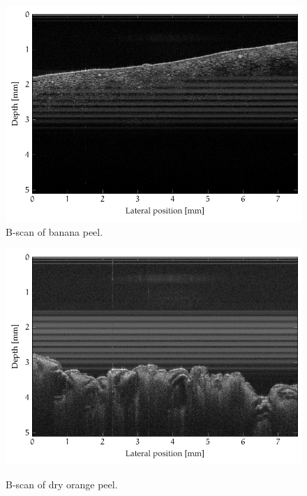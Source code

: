 \begin{figure}[hbt]
\centering
\includegraphics[width=\linewidth]{gfx/tikz/axsun/banana-peel}
\caption{B-scan of banana peel.}\label{fig:banana-peel}
\end{figure}%
\begin{figure}[hbt]
\myfloatalign
{\includegraphics[width=\linewidth]{gfx/tikz/axsun/dry-orange-peel}}
\caption{B-scan of dry orange peel.}\label{fig:dry-orange-peel}
\end{figure}%

